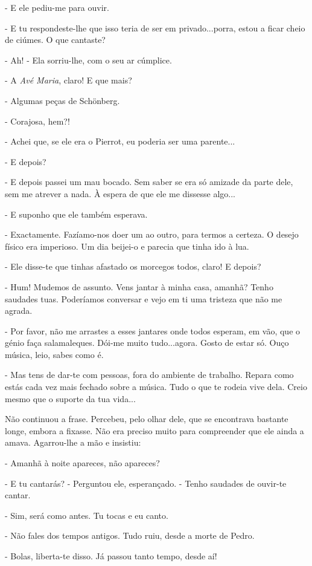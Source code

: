 - E ele pediu-me para ouvir.

- E tu respondeste-lhe que isso teria de ser em privado...porra, estou a
ficar cheio de ciúmes. O que cantaste?

- Ah! - Ela sorriu-lhe, com o seu ar cúmplice.

- A \emph{Avé Maria}, claro! E que mais?

- Algumas peças de Schönberg.

- Corajosa, hem?!

- Achei que, se ele era o Pierrot, eu poderia ser uma parente...

- E depois?

- E depois passei um mau bocado. Sem saber se era só amizade da parte
dele, sem me atrever a nada. À espera de que ele me dissesse algo...

- E suponho que ele também esperava.

- Exactamente. Fazíamo-nos doer um ao outro, para termos a certeza. O
desejo físico era imperioso. Um dia beijei-o e parecia que tinha ido à
lua.

- Ele disse-te que tinhas afastado os morcegos todos, claro! E depois?

- Hum! Mudemos de assunto. Vens jantar à minha casa, amanhã? Tenho
saudades tuas. Poderíamos conversar e vejo em ti uma tristeza que não me
agrada.

- Por favor, não me arrastes a esses jantares onde todos esperam, em
vão, que o génio faça salamaleques. Dói-me muito tudo...agora. Gosto de
estar só. Ouço música, leio, sabes como é.

- Mas tens de dar-te com pessoas, fora do ambiente de trabalho. Repara
como estás cada vez mais fechado sobre a música. Tudo o que te rodeia
vive dela. Creio mesmo que o suporte da tua vida...

Não continuou a frase. Percebeu, pelo olhar dele, que se encontrava
bastante longe, embora a fixasse. Não era preciso muito para compreender
que ele ainda a amava. Agarrou-lhe a mão e insistiu:

- Amanhã à noite apareces, não apareces?

- E tu cantarás? - Perguntou ele, esperançado. - Tenho saudades de
ouvir-te cantar.

- Sim, será como antes. Tu tocas e eu canto.

- Não fales dos tempos antigos. Tudo ruiu, desde a morte de Pedro.

- Bolas, liberta-te disso. Já passou tanto tempo, desde aí!

